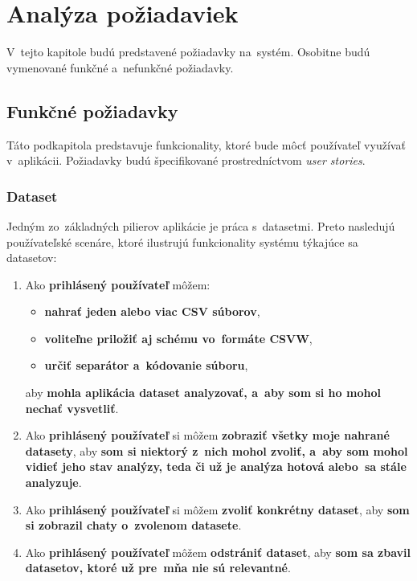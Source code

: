 \chapter{Analýza požiadaviek}
\label{requirements-analysis}

V~tejto kapitole budú predstavené požiadavky na~systém. Osobitne budú vymenované funkčné a~nefunkčné požiadavky.

\section{Funkčné požiadavky}

Táto podkapitola predstavuje funkcionality, ktoré bude môcť používateľ využívať v~aplikácii. Požiadavky budú špecifikované prostredníctvom \textit{user stories}.

\subsection{Dataset}
\label{dataset}

Jedným zo~základných pilierov aplikácie je práca s~datasetmi. Preto nasledujú používateľské scenáre, ktoré ilustrujú funkcionality systému týkajúce sa datasetov:

\begin{enumerate}
\item Ako \textbf{prihlásený používateľ} môžem:
\begin{itemize}
\item \textbf{nahrať jeden alebo viac CSV súborov},
\item \textbf{voliteľne priložiť aj schému vo~formáte CSVW},
\item \textbf{určiť separátor a~kódovanie súboru},
\end{itemize}
aby \textbf{mohla aplikácia dataset analyzovať, a~aby som si ho mohol nechať vysvetliť}.

\item Ako \textbf{prihlásený používateľ} si môžem \textbf{zobraziť všetky moje nahrané datasety}, aby \textbf{som si niektorý z~nich mohol zvoliť, a~aby som mohol vidieť jeho stav analýzy, teda či už je analýza hotová alebo~sa stále analyzuje}.

\item Ako \textbf{prihlásený používateľ} si môžem \textbf{zvoliť konkrétny dataset}, aby \textbf{som si zobrazil chaty o~zvolenom datasete}.

\item Ako \textbf{prihlásený používateľ} môžem \textbf{odstrániť dataset}, aby \textbf{som sa zbavil datasetov, ktoré už pre~mňa nie sú relevantné}.
\end{enumerate}

